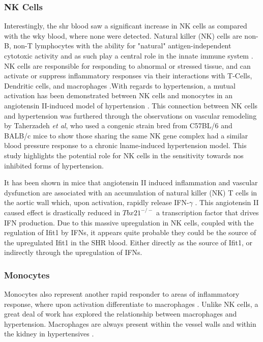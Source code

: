 \subsubsection{NK Cells}
Interestingly, the \acrshort{shr} blood saw a significant increase in NK cells as compared with the \acrshort{wky} blood, where none were detected. Natural killer (NK) cells are non-B, non-T lymphocytes with the ability for "natural" antigen-independent cytotoxic activity and as such play a central role in the innate immune system \cite{Vivier2016}. NK cells are responsible for responding to abnormal or stressed tissue, and can activate or suppress inflammatory responses via their interactions with T-Cells, Dendritic cells, and macrophages \cite{Vivier2008}.With regards to hypertension, a mutual activation has been demonstrated between NK cells and monocytes in an angiotensin II-induced model of hypertension \cite{Kossmann2013}. This connection between NK cells and hypertension was furthered through the observations on vascular remodeling by Taherzadeh \textit{et al}, who used a congenic strain bred from C57BL/6 and BALB/c mice to show those sharing the same NK gene complex had a similar blood pressure response to a chronic \acrshort{lname}-induced hypertension model. This study highlights the potential role for NK cells in the sensitivity towards \acrfull{nos} inhibited forms of hypertension.

It has been shown in mice that angiotensin II induced inflammation and vascular dysfunction are associated with an accumulation of natural killer (NK) T cells in the aortic wall which, upon activation, rapidly release IFN-$\gamma$ \cite{Kossmann2013}. This angiotensin II caused effect is drastically reduced in $Tbx21^{-/-}$  a transcription factor that drives IFN production. Due to this massive upregulation in NK cells, coupled with the regulation of Ifit1 by IFNs, it appears quite probable they could be the source of the upregulated Ifit1 in the SHR blood. Either directly as the source of Ifit1, or indirectly through the upregulation of IFNs. 


\subsubsection{Monocytes}
Monocytes also represent another rapid responder to areas of inflammatory response, where upon activation differentiate to macrophages \cite{Ginhoux2014}. Unlike NK cells, a great deal of work has explored the relationship between macrophages and hypertension. Macrophages are always present within the vessel walls and within the kidney in hypertensives \cite{Rodriguez-Iturbe2017}. 

